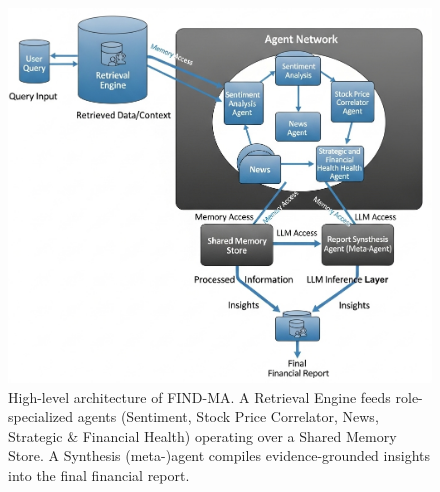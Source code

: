\documentclass[11pt]{article}
\newcommand{\findma}{\textsc{FIND-MA}}
\begin{document}
\begin{figure}[t]
  \centering
  \includegraphics[width=\linewidth]{system-arch-diagram.png}
  \caption{High-level architecture of \findma{}. A Retrieval Engine feeds role-specialized agents (Sentiment, Stock Price Correlator, News, Strategic \& Financial Health) operating over a Shared Memory Store. A Synthesis (meta-)agent compiles evidence-grounded insights into the final financial report.}
  \label{fig:system-arch}
\end{figure}
\end{document}
